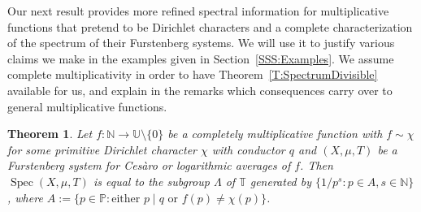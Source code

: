 \documentclass[11pt]{amsart}
\newtheorem{theorem}[lemma]{Theorem}
\theoremstyle{definition}
\newcommand{\N}{{\mathbb N}}
\renewcommand{\P}{{\mathbb P}}
\newcommand{\T}{{\mathbb T}}
\newcommand{\U}{{\mathbb U}}
\DeclareMathOperator{\spec}{Spec}
\begin{document}
Our next result provides    more refined spectral information
for  multiplicative functions that pretend   to be Dirichlet characters and a complete characterization of  the spectrum of their Furstenberg systems. We will use it to justify various
claims we make in the examples given in Section~\ref{SSS:Examples}. We assume complete multiplicativity in order to have Theorem~\ref{T:SpectrumDivisible} available for us, and explain in the remarks which consequences carry over to   general multiplicative functions.
\begin{theorem}	\label{T:ExactSpectrum}
	Let 	$f\colon \N\to \U\setminus\{0\}$ be a completely multiplicative function with $f\sim \chi$ for some primitive Dirichlet character $\chi$ with conductor $q$ 
	and $(X,\mu,T)$ be a Furstenberg system for Ces\`aro or logarithmic   averages of  $f$. Then
			  $\spec(X,\mu,T)$ is equal to the  subgroup $\Lambda$  of $\T$ generated   by $\{1/p^s\colon p\in A, s\in\N \}$, where $A:=\{p\in \P\colon \text{either } p\mid q \text{ or }f(p)\neq \chi(p)\}$.
\end{theorem}
\end{document}
